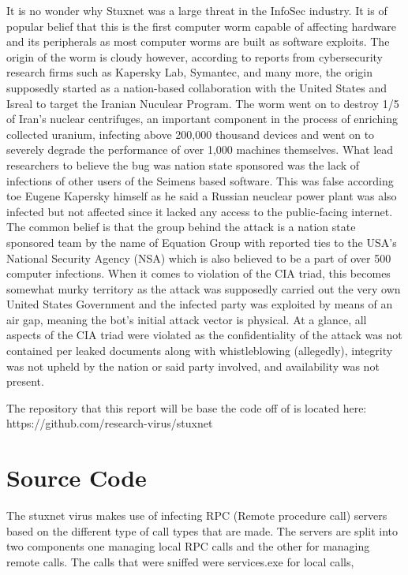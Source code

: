 \documentclass[12pt, letterpaper]{article}
\begin{document}
\begin{sloppypar}
\begin{flushleft}
It is no wonder why Stuxnet was a 
large threat in the InfoSec industry. It is of popular belief that this is
the first computer worm capable of affecting hardware and its peripherals as
most computer worms are built as software exploits. The origin of the worm is 
cloudy however, according to reports from cybersecurity research firms such 
as Kapersky Lab, Symantec, and many more, the origin supposedly started as 
a nation-based collaboration with the United States and Isreal to target the
Iranian Nuculear Program. The worm went on to destroy 1/5 of Iran's nuclear 
centrifuges, an important component in the process of enriching collected
uranium, infecting above 200,000 thousand devices and went on to severely 
degrade the performance of over 1,000 machines themselves. What lead 
researchers to believe the bug was nation state sponsored was the lack of
infections of other users of the Seimens based software. This was false 
according toe Eugene Kapersky himself as he said a Russian neuclear power
plant was also infected but not affected since it lacked any access to the
public-facing internet. The common belief is that the group behind the attack
is a nation state sponsored team by the name of Equation Group with reported
ties to the USA's National Security Agency (NSA) which is also believed to 
be a part of over 500 computer infections. When it comes to violation of the 
CIA triad, this becomes somewhat murky territory as the attack was supposedly
carried out the very own United States Government and the infected party was
exploited by means of an air gap, meaning the bot's initial attack vector
is physical. At a glance, all aspects of the CIA triad were violated as 
the confidentiality of the attack was not contained per leaked documents 
along with whistleblowing (allegedly), integrity was not upheld by the nation
or said party involved, and availability was not present. 


The repository that this report will be base the code off of is located 
here: https://github.com/research-virus/stuxnet




\section{Source Code}
The stuxnet virus makes use of infecting RPC (Remote procedure call) servers based on 
the different type of call types that are made. The servers are split into two 
components one managing local RPC calls and the other for managing remote calls. 
The calls that were sniffed were services.exe for local calls, 
 


\end{flushleft}
\end{sloppypar}
\end{document}
